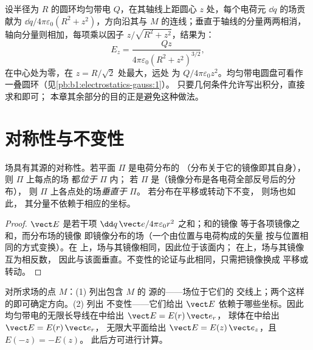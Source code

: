 \begin{example}\label{ex:b1:electrostatics-gauss:ring}
设半径为 $R$ 的圆环均匀带电 $Q$，在其轴线上距圆心
$z$ 处，每个电荷元 $\dd q$ 的场贡献为 $\dd q/4\pi\varepsilon_0(R^2 +
z^2)$，方向沿其与 $M$ 的连线；垂直于轴线的分量两两相消，
轴向分量则相加，每项乘以因子
$z/\sqrt{R^2 + z^2}$，结果为：
\[
E_z = \frac{Qz}{4\pi\varepsilon_0(R^2 + z^2)^{3/2}} ,
\]
在中心处为零，在 $z = R/\sqrt2$ 处最大，远处
为 $Q/4\pi\varepsilon_0z^2$。均匀带电圆盘可看作一叠圆环（见\cref{pb:b1:electrostatics-gauss:1}）。
只要几何条件允许写出积分，直接求和即可；
本章其余部分的目的正是避免这种做法。
\end{example}

\section{对称性与不变性}

\begin{proposition}[对称性原理]\label{prop:b1:electrostatics-gauss:symmetry}
场具有其源的对称性。若平面 $\Pi$ 是电荷分布的
\emph{}（分布关于它的镜像即其自身），则 $\Pi$ 上每点的场
都\emph{位于} $\Pi$ 内；
若 $\Pi$ 是\emph{}（镜像分布是各电荷全部反号后的分布），
则 $\Pi$ 上各点处的场\emph{垂直于} $\Pi$。
若分布在平移或转动下不变，
则场也如此，
其分量不依赖于相应的坐标。
\end{proposition}

\begin{proof}
$\vect E$ 是若干项 $\dd q\,\vect e/4\pi\varepsilon_0r^2$ 之和；和的镜像
等于各项镜像之和，而分布场的镜像
即镜像分布的场（一个由位置与电荷构成的矢量
按与位置相同的方式变换）。在
上，场与其镜像相同，因此位于该面内；
在上，场与其镜像互为相反数，
因此与该面垂直。不变性的论证与此相同，只需把镜像换成
平移或转动。
\end{proof}

\begin{method}[计算前先确定场的形状]\label{meth:b1:electrostatics-gauss:symmetry}
对所求场的点 $M$：(1) 列出包含 $M$ 的
源的——场位于它们的
交线上；两个这样的即可确定方向。(2) 列出
不变性——它们给出 $\vect E$ 依赖于哪些坐标。因此
均匀带电的无限长导线在中给出 $\vect E = E(r)\,\vect e_r$，
球体在中给出 $\vect E = E(r)\,\vect e_r$，
无限大平面给出 $\vect E = E(z)\,\vect e_z$，且 $E(-z) = -E(z)$。
此后方可进行计算。
\end{method}

